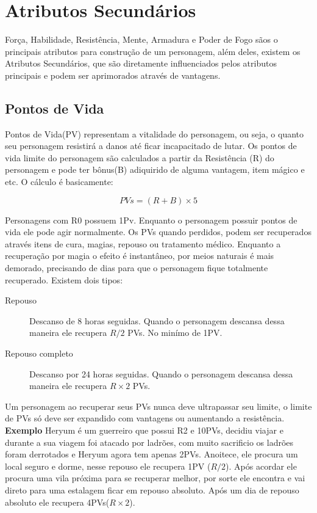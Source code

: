 \section{Atributos Secundários}

Força, Habilidade, Resistência, Mente, Armadura e Poder de Fogo sãos o principais atributos para construção de um personagem, além deles, existem os Atributos Secundários, que são diretamente influenciados pelos atributos principais e podem ser aprimorados através de vantagens.

\subsection{Pontos de Vida}

Pontos de Vida(PV) representam a vitalidade do personagem, ou seja, o quanto seu personagem resistirá a danos até ficar incapacitado de lutar. Os pontos de vida limite do personagem são calculados a partir da Resistência (R) do personagem e pode ter bônus(B) adiquirido de alguma vantagem, item mágico e etc. O cálculo é basicamente:

\[ PVs = (R + B) \times 5 \]

Personagens com R0 possuem 1Pv. Enquanto o personagem possuir pontos de vida ele pode agir normalmente. Os PVs quando perdidos, podem ser recuperados através itens de cura, magias, repouso ou tratamento médico. Enquanto a recuperação por magia o efeito é instantâneo, por meios naturais é mais demorado, precisando de dias para que o personagem fique totalmente recuperado. Existem dois tipos:

\begin{description}
\item[Repouso] Descanso de 8 horas seguidas. Quando o personagem descansa dessa maneira ele recupera \( R/2 \) PVs. No minímo de 1PV.
\item[Repouso completo] Descanso por 24 horas seguidas. Quando o personagem descansa dessa maneira ele recupera \( R \times 2 \) PVs.
\end{description}

Um personagem ao recuperar seus PVs nunca deve ultrapassar seu limite, o limite de PVs só deve ser expandido com vantagens ou aumentando a resistência. {\bf Exemplo } Heryum é um guerreiro que possui R2 e 10PVs, decidiu viajar e durante a sua viagem foi atacado por ladrões, com muito sacrificio os ladrões foram derrotados e Heryum agora tem apenas 2PVs. Anoitece, ele procura um local seguro e dorme, nesse repouso ele recupera 1PV (\( R / 2 \)). Após acordar ele procura uma vila próxima para se recuperar melhor, por sorte ele encontra e vai direto para uma estalagem ficar em repouso absoluto. Após um dia de repouso absoluto ele recupera 4PVs(\( R \times 2 \)).

